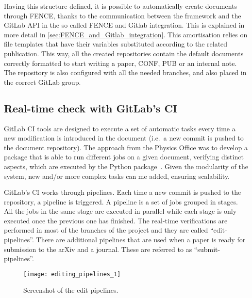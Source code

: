 Having this structure defined, it is possible to automatically create documents through FENCE, thanks to the communication between the framework and the GitLab API in the so called FENCE and Gitlab integration.
This is explained in more detail in \cref{sec:FENCE_and_Gitlab_integration}.
This amortisation relies on file templates that have their variables substituted according to the related publication.
This way, all the created repositories contain the default documents correctly formatted to start writing a paper, CONF, PUB or an internal note.
The repository is also configured with all the needed branches,
 and also placed in the correct GitLab group.


\subsection{Real-time check with GitLab’s CI}%
\label{sec:Real-time_check_with GitLabs_CI}

GitLab CI tools are designed to execute a set of automatic tasks every time a new modification is introduced in the document (i.e.\ a new commit is pushed to the document repository).
The approach from the Physics Office was to develop a package that is able to run different jobs on a given document, verifying distinct aspects, which are executed by the \pogitlab Python package~\cite{pogitlab-repo}.
Given the modularity of the system, new and/or more complex tasks can me added, ensuring scalability.  
                    
GitLab’s CI works through pipelines. Each time a new commit is pushed to the repository, a pipeline is triggered.
A pipeline is a set of jobs grouped in stages. All the jobs in the same stage are executed in parallel while each stage is only executed once the previous one has finished.
The real-time verifications are performed in most of the branches of the project and they are called \enquote{edit-pipelines}.
There are additional pipelines that are used when a paper is ready for submission to the arXiv and a journal. These are referred to as \enquote{submit-pipelines}.

\begin{figure}[htb]
  \centering
  \texttt{[image: editing\_pipelines\_1]}
  \caption{Screenshot of the edit-pipelines.}%
  \label{fig:edit-pipelines}
\end{figure}

